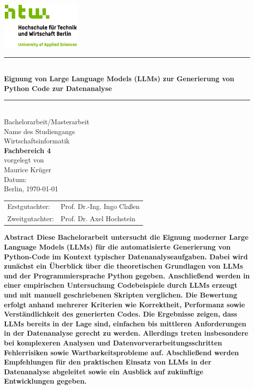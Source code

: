 \documentclass[11pt,a4paper]{article}
\begin{document}
\begin{titlepage}
    \centering
    
    \includegraphics[width=4cm]{./bilder/S04_HTW_Berlin_Logo_pos_FARBIG_RGB.jpg}\\[1.0cm]
    \rule{\linewidth}{0.5pt}\\[0.7cm]
    
    {\color{htwgreen}\bfseries\Large Eignung von Large Language Models (LLMs) zur Generierung von Python Code zur
    Datenanalyse}\\[0.5cm]
    \rule{\linewidth}{0.5pt}\\[2.0cm]
    {\large Bachelorarbeit/Masterarbeit}\\[1.5cm]
    
    {\large Name des Studiengangs}\\
    {\LARGE Wirtschaftsinformatik}\\[0.3cm]
    {\color{htwgreen}\LARGE \textbf{Fachbereich 4}}\\[1.5cm]
    
    {vorgelegt von}\\
    {\LARGE Maurice Krüger}\\[3cm]
    
    {\Large Datum:}\\
    Berlin, \today\\[2.5cm]

    {\LARGE
    \begin{tabular}{l l}
        Erstgutachter:  & Prof. Dr.-Ing. Ingo Claßen \\
        Zweitgutachter: & Prof. Dr. Axel Hochstein \\
    \end{tabular}
    }

\end{titlepage}

\textbf{
    Abstract
    Diese Bachelorarbeit untersucht die Eignung moderner Large Language Models (LLMs) für die automatisierte Generierung von Python-Code im Kontext typischer Datenanalyseaufgaben. Dabei wird zunächst ein Überblick über die theoretischen Grundlagen von LLMs und der Programmiersprache Python gegeben. Anschließend werden in einer empirischen Untersuchung Codebeispiele durch LLMs erzeugt und mit manuell geschriebenen Skripten verglichen. Die Bewertung erfolgt anhand mehrerer Kriterien wie Korrektheit, Performanz sowie Verständlichkeit des generierten Codes. Die Ergebnisse zeigen, dass LLMs bereits in der Lage sind, einfachen bis mittleren Anforderungen in der Datenanalyse gerecht zu werden. Allerdings treten insbesondere bei komplexeren Analysen und Datenvorverarbeitungsschritten Fehlerrisiken sowie Wartbarkeitsprobleme auf. Abschließend werden Empfehlungen für den praktischen Einsatz von LLMs in der Datenanalyse abgeleitet sowie ein Ausblick auf zukünftige Entwicklungen gegeben.
}
\newpage
\end{document}
